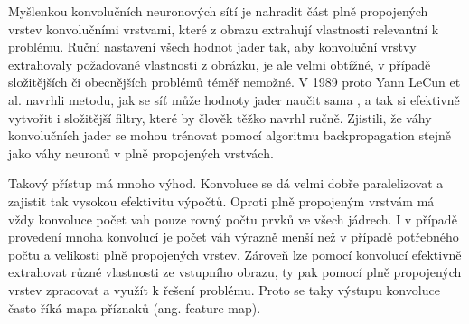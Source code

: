 

Myšlenkou konvolučních neuronových sítí je nahradit část plně propojených
vrstev konvolučními vrstvami, které z obrazu extrahují vlastnosti relevantní k
problému. Ruční nastavení všech hodnot jader tak, aby konvoluční vrstvy
extrahovaly požadované vlastnosti z obrázku, je ale velmi obtížné, v případě
složitějších či obecnějších problémů téměř nemožné. V 1989 proto Yann LeCun et
al. navrhli metodu, jak se síť může hodnoty jader naučit sama \cite{lecun1989},
a tak si efektivně vytvořit i složitější filtry, které by člověk těžko navrhl
ručně. Zjistili, že váhy konvolučních jader se mohou trénovat pomocí algoritmu
backpropagation stejně jako váhy neuronů v plně propojených vrstvách.

Takový přístup má mnoho výhod. Konvoluce se dá velmi dobře paralelizovat a
zajistit tak vysokou efektivitu výpočtů. Oproti plně propojeným vrstvám má vždy
konvoluce počet vah pouze rovný počtu prvků ve všech jádrech. I v případě
provedení mnoha konvolucí je počet váh výrazně menší než v případě potřebného
počtu a velikosti plně propojených vrstev. Zároveň lze pomocí konvolucí
efektivně extrahovat různé vlastnosti ze vstupního obrazu, ty pak pomocí plně
propojených vrstev zpracovat a využít k řešení problému. Proto se taky výstupu
konvoluce často říká mapa příznaků (ang. feature map).

